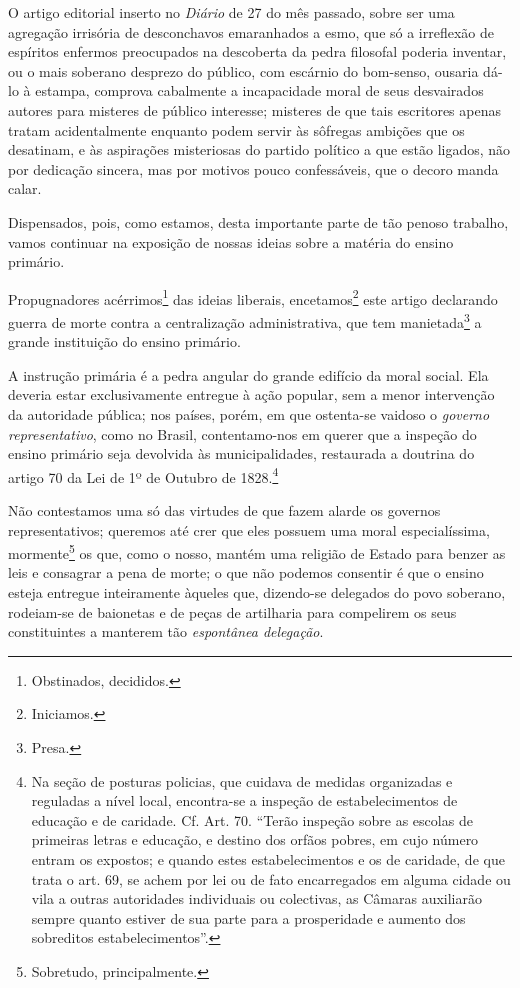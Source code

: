O artigo editorial inserto no \emph{Diário} de 27 do mês passado, sobre
ser uma agregação irrisória de desconchavos emaranhados a esmo, que só a
irreflexão de espíritos enfermos preocupados na descoberta da pedra
filosofal poderia inventar, ou o mais soberano desprezo do público, com
escárnio do bom-senso, ousaria dá-lo à estampa, comprova cabalmente a
incapacidade moral de seus desvairados autores para misteres de público
interesse; misteres de que tais escritores apenas tratam acidentalmente
enquanto podem servir às sôfregas ambições que os desatinam, e às
aspirações misteriosas do partido político a que estão ligados, não por
dedicação sincera, mas por motivos pouco confessáveis, que o decoro
manda calar.

Dispensados, pois, como estamos, desta importante parte de tão penoso
trabalho, vamos continuar na exposição de nossas ideias sobre a matéria
do ensino primário.

Propugnadores acérrimos\footnote{Obstinados, decididos.} das ideias
liberais, encetamos\footnote{Iniciamos.} este artigo declarando guerra
de morte contra a centralização administrativa, que tem
manietada\footnote{Presa.} a grande instituição do ensino primário.

A instrução primária é a pedra angular do grande edifício da moral
social. Ela deveria estar exclusivamente entregue à ação popular, sem a
menor intervenção da autoridade pública; nos países, porém, em que
ostenta-se vaidoso o \emph{governo representativo}, como no Brasil,
contentamo-nos em querer que a inspeção do ensino primário seja
devolvida às municipalidades, restaurada a doutrina do artigo 70 da Lei
de 1º de Outubro de 1828.\footnote{Na seção de posturas policias, que
  cuidava de medidas organizadas e reguladas a nível local, encontra-se
  a inspeção de estabelecimentos de educação e de caridade. Cf. Art. 70.
  ``Terão inspeção sobre as escolas de primeiras letras e educação, e
  destino dos orfãos pobres, em cujo número entram os expostos; e quando
  estes estabelecimentos e os de caridade, de que trata o art. 69, se
  achem por lei ou de fato encarregados em alguma cidade ou vila a
  outras autoridades individuais ou colectivas, as Câmaras auxiliarão
  sempre quanto estiver de sua parte para a prosperidade e aumento dos
  sobreditos estabelecimentos''.}

Não contestamos uma só das virtudes de que fazem alarde os governos
representativos; queremos até crer que eles possuem uma moral
especialíssima, mormente\footnote{Sobretudo, principalmente.} os que,
como o nosso, mantém uma religião de Estado para benzer as leis e
consagrar a pena de morte; o que não podemos consentir é que o ensino
esteja entregue inteiramente àqueles que, dizendo-se delegados do povo
soberano, rodeiam-se de baionetas e de peças de artilharia para
compelirem os seus constituintes a manterem tão \emph{espontânea
delegação}.


